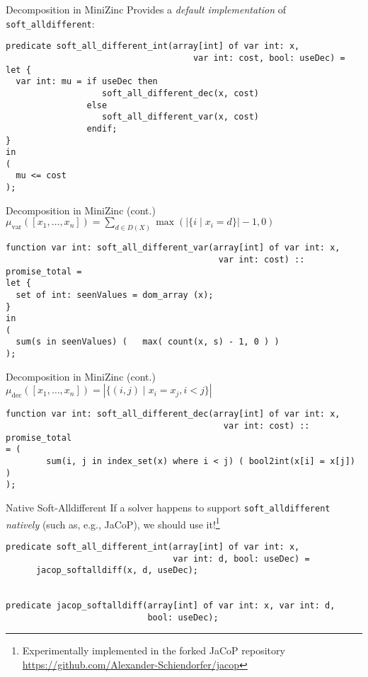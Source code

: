 \documentclass[10pt,xcolor={dvipsnames},fleqn]{beamer}
\begin{document}
\begin{frame}[fragile]{Decomposition in MiniZinc}
Provides a \emph{default implementation} of \texttt{soft\_alldifferent}:
\begin{lstlisting}
predicate soft_all_different_int(array[int] of var int: x, 
                                     var int: cost, bool: useDec) = 
let {
  var int: mu = if useDec then 
                   soft_all_different_dec(x, cost)
                else 
                   soft_all_different_var(x, cost)
                endif; 
} 
in 
(
  mu <= cost
);
\end{lstlisting}

\end{frame}


\begin{frame}[fragile]{Decomposition in MiniZinc (cont.)}
$\mu_{\textrm{var}}([x_1, \ldots, x_n]) =  \sum_{d \in D(X)} \max (|\{i \mid x_i = d\}|-1, 0)$

\vspace*{2ex}

\begin{lstlisting}
function var int: soft_all_different_var(array[int] of var int: x, 
                                          var int: cost) :: promise_total = 
let {
  set of int: seenValues = dom_array (x);
}
in 
(
  sum(s in seenValues) (   max( count(x, s) - 1, 0 ) )
);
\end{lstlisting}

\end{frame}

\begin{frame}[fragile]{Decomposition in MiniZinc (cont.)}
$\mu_{\textrm{dec}}([x_1, \ldots, x_n]) =  |\{ (i,j) \mid x_i = x_j, i < j \} |$

\vspace*{2ex}

\begin{lstlisting}
function var int: soft_all_different_dec(array[int] of var int: x, 
                                           var int: cost) :: promise_total 
= (
        sum(i, j in index_set(x) where i < j) ( bool2int(x[i] = x[j]) ) 
);
\end{lstlisting}

\end{frame}

\begin{frame}[fragile]{Native Soft-Alldifferent}
If a solver happens to support \texttt{soft\_alldifferent} \emph{natively} (such as, e.g., JaCoP), we should use it!\footnote{Experimentally
implemented in the forked JaCoP repository \url{https://github.com/Alexander-Schiendorfer/jacop}}

\begin{lstlisting}
predicate soft_all_different_int(array[int] of var int: x, 
                                 var int: d, bool: useDec) =
	  jacop_softalldiff(x, d, useDec);


predicate jacop_softalldiff(array[int] of var int: x, var int: d, 
                            bool: useDec);
\end{lstlisting}


\end{frame}
\end{document}
